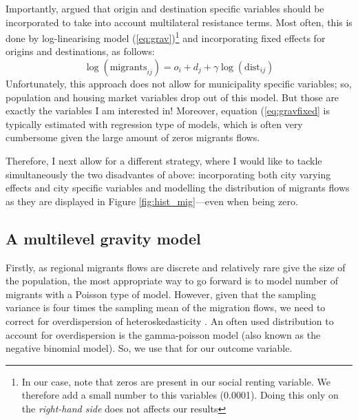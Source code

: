 \documentclass[fleqn,10pt]{SelfArx} %
\begin{document}
        Importantly, \citet{anderson2003gravity} argued that origin
        and destination specific variables should be incorporated to
        take into account multilateral resistance terms. Most often,
        this is done by log-linearising model
        (\ref{eq:grav})\footnote{In our case, note that zeros are
          present in our social renting variable. We therefore add a
          small number to this variables (0.0001). Doing this only on
          the \emph{right-hand side} does not affects our results} and
        incorporating fixed effects for origins and destinations, as
        follows:
        \begin{equation}
          \log(\text{migrants}_{ij}) = o_i + d_j +  \gamma\log(\text{dist}_{ij})
          \label{eq:gravfixed}
        \end{equation} 
        Unfortunately, this approach does not allow for municipality
        specific variables; so, population and housing market
        variables drop out of this model. But those are exactly the
        variables I am  interested in! Moreover, equation
        (\ref{eq:gravfixed} is typically estimated with regression
        type of models, which is often very cumbersome given the large
        amount of zeros migrants flows.

        Therefore, I next allow for a different strategy, where I
        would like to tackle simultaneously the two disadvantes of above:
        incorporating both city varying effects and city specific variables and
        modelling the distribution of migrants flows as they are
        displayed in Figure \ref{fig:hist_mig}---even when being zero.

        \subsection{A multilevel gravity model}

        Firstly, as regional migrants flows are discrete and
        relatively rare give the size of the population, the most
        appropriate way to go forward is to model number of migrants
        with a Poisson type of model. However, given that the sampling
        variance is four times the sampling mean of the migration
        flows, we need to correct for overdispersion of
        heteroskedasticity \citep[][states that heteroskedasticity
        (rather than the presence of too many zeros) is responsible
        for the main differences.]{silva2006log}. An often used
        distribution to account for overdispersion is the
        gamma-poisson model (also known as the negative binomial
        model). So, we use that for our outcome variable. 
\end{document}
